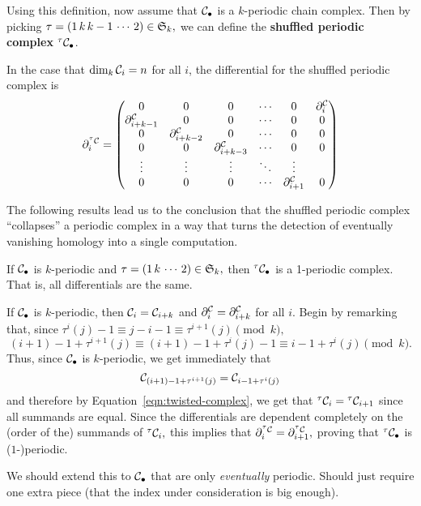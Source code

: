 \documentclass[12pt]{article}
\begin{document}
Using this definition, now assume that $\mathcal{C}_\bullet$ is a $k$-periodic chain complex. Then by picking $\tau=(1\,k\,k-1\,\cdots\,2)\in\mathfrak{S}_k,$ we can define the \textbf{shuffled periodic complex} $^\tau\mathcal{C}_\bullet$.
\begin{rmk}
    In the case that $\dim_k \mathcal{C}_i=n$ for all $i$, the differential for the shuffled periodic complex is
\[\partial^{^\tau\mathcal{C}}_i=\begin{pmatrix}
0 & 0 & 0 & \cdots &0& \partial^{\mathcal{C}}_{i}\\
\partial^{\mathcal{C}}_{i+k-1} & 0 & 0 & \cdots &0& 0\\
0&\partial^{\mathcal{C}}_{i+k-2}& 0 & \cdots &0& 0\\
0 & 0 &\partial^{\mathcal{C}}_{i+k-3}& \cdots &0& 0\\
\vdots &\vdots & \vdots & \ddots & \vdots\\
0 & 0 & 0 & \cdots & \partial^{\mathcal{C}}_{i+1} & 0
\end{pmatrix}\]
\end{rmk}

The following results lead us to the conclusion that the shuffled periodic complex ``collapses'' a periodic complex in a way that turns the detection of eventually vanishing homology into a single computation. 
\begin{prop}\label{prop:periodic}
    If $\mathcal{C}_\bullet$ is $k$-periodic and $\tau=(1\,k\,\cdots\, 2)\in\mathfrak{S}_k,$ then $^\tau\mathcal{C}_\bullet$ is a 1-periodic complex. That is, all differentials are the same.
\end{prop}
\begin{prf}
    If $\mathcal{C}_\bullet$ is $k$-periodic, then $\mathcal{C}_i=\mathcal{C}_{i+k}$ and $\partial^{\mathcal{C}}_i=\partial^{\mathcal{C}}_{i+k}$ for all $i$. Begin by remarking that, since $\tau^i(j)-1\equiv j-i-1\equiv\tau^{i+1}(j)\pmod{k},$
    \[(i+1)-1+\tau^{i+1}(j)\equiv(i+1)-1+\tau^i(j)-1\equiv i-1+\tau^i(j)\pmod{k}.\]
    Thus, since $\mathcal{C}_\bullet$ is $k$-periodic, we get immediately that
    \[\mathcal{C}_{(i+1)-1+\tau^{i+1}(j)}=\mathcal{C}_{i-1+\tau^i(j)}\]
    and therefore by Equation~\ref{eqn:twisted-complex}, we get that $^\tau\mathcal{C}_i={^\tau\mathcal{C}_{i+1}}$ since all summands are equal. Since the differentials are dependent completely on the (order of the) summands of $^\tau\mathcal{C}_i,$ this implies that $\partial^{^\tau\mathcal{C}}_i=\partial^{^\tau\mathcal{C}}_{i+1},$ proving that $^\tau\mathcal{C}_\bullet$ is ($1$-)periodic.
\end{prf}
{\color{red}We should extend this to $\mathcal{C}_\bullet$ that are only \textit{eventually} periodic. Should just require one extra piece (that the index under consideration is big enough).}
\end{document}
